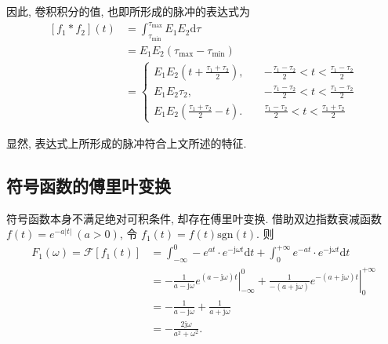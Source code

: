 因此, 卷积积分的值, 也即所形成的脉冲的表达式为
\begin{align}
    \nonumber [f_1*f_2](t) & =\int_{\tau_\mathrm{min}}^{\tau_\mathrm{max}}E_1E_2\mathrm{d}\tau                                                      \\
    \nonumber              & =E_1E_2(\tau_\mathrm{max}-\tau_\mathrm{min})                                                                           \\
                           & =\begin{cases}
                                  \displaystyle
                                  E_1E_2\left(t+\frac{\tau_1+\tau_2}{2}\right),\quad & \displaystyle -\frac{\tau_1-\tau_2}{2}<t<\frac{\tau_1-\tau_2}{2} \\
                                  \displaystyle
                                  E_1E_2\tau_2,\quad                                 & \displaystyle -\frac{\tau_1-\tau_2}{2}<t<\frac{\tau_1-\tau_2}{2} \\
                                  \displaystyle
                                  E_1E_2\left(\frac{\tau_1+\tau_2}{2}-t\right).\quad & \displaystyle \frac{\tau_1-\tau_2}{2}<t<\frac{\tau_1+\tau_2}{2}
                              \end{cases}
\end{align}

显然, 表达式上所形成的脉冲符合上文所述的特征.

\subsection{符号函数的傅里叶变换} \label{proofs 符号函数的傅里叶变换}
符号函数本身不满足绝对可积条件, 却存在傅里叶变换. 借助双边指数衰减函数 $f(t)=e^{-a|t|}\ (a>0)$, 令 $f_1(t)=f(t)\mathrm{sgn}(t)$. 则
\begin{equation}
    \begin{aligned}
        F_1(\omega)=\mathcal{F}[f_1(t)] & =\int_{-\infty}^{0}-e^{at}\cdot e^{-\mathrm{j}\omega t}\mathrm{d}t+\int_{0}^{+\infty}e^{-at}\cdot e^{-\mathrm{j}\omega t}\mathrm{d}t                                    \\
                                        & =\left.-\frac{1}{a-\mathrm{j}\omega}e^{(a-\mathrm{j}\omega)t}\right|_{-\infty}^{0}+\left.\frac{1}{-(a+\mathrm{j}\omega)}e^{-(a+\mathrm{j}\omega)t}\right|_{0}^{+\infty} \\
                                        & =-\frac{1}{a-\mathrm{j}\omega}+\frac{1}{a+\mathrm{j}\omega}                                                                                                             \\
                                        & =-\frac{2\mathrm{j}\omega}{a^2+\omega^2}.
    \end{aligned}
\end{equation}

